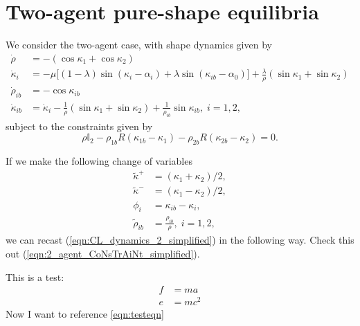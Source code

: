 \section{Two-agent pure-shape equilibria}

We consider the two-agent case, with shape dynamics given by
\begin{align}
\dot{\rho} &= - (\cos\kappa_1 + \cos\kappa_2) \\
\dot{\kappa}_i &= - \mu \Big[(1 - \lambda)\sin(\kappa_i - \alpha_i) + \lambda \sin(\kappa_{ib} - \alpha_0) \Big] + \frac{\lambda}{\rho}(\sin\kappa_1 + \sin\kappa_2) \\
\dot{\rho}_{ib} &= - \cos\kappa_{ib}  \\
\dot{\kappa}_{ib} &= \dot{\kappa}_i - \frac{1}{\rho}(\sin\kappa_1 + \sin\kappa_2) + \frac{1}{\rho_{ib}} \sin\kappa_{ib},  \; i=1,2,
\end{align}
subject to the constraints given by
\begin{equation}
\rho \mathbb{I}_2 - \rho_{1b} R(\kappa_{1b} - \kappa_1) - \rho_{2b} R(\kappa_{2b} - \kappa_{2}) = 0. 
\label{eqn:2_agent_CoNsTrAiNt_simplified}
\end{equation}

If we make the following change of variables
\begin{align*}
\tilde{\kappa}^+ 
&= (\kappa_1 + \kappa_2)/2,
\nonumber \\
\tilde{\kappa}^- 
&= 
(\kappa_1 - \kappa_2)/2,
\nonumber \\
\phi_{i} 
&= 
\kappa_{ib} - \kappa_i,
\nonumber \\
\tilde{\rho}_{ib} 
&= 
\frac{\rho_{ib} }{\rho}, 
\; i=1,2,
\end{align*}
we can recast (\ref{eqn:CL_dynamics_2_simplified}) in the following way. Check this out (\ref{eqn:2_agent_CoNsTrAiNt_simplified}).

This is a test:
\begin{align}
\label{eqn:testeqn}
f &= m a \nonumber \\
e & =m c^2
\end{align}
Now I want to reference \ref{eqn:testeqn}
  
  
  
  
  
  
  
  
  
  
  
  
  
  
  
  
  
  
  
  
  
  
  
  
  
  
  